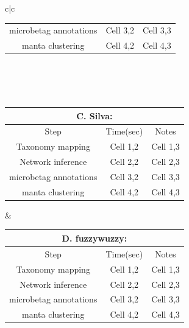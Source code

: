 \documentclass[sn-mathphys,Numbered, lineno]{sn-jnl}  %
\theoremstyle{thmstyleone}%
\theoremstyle{thmstyletwo}%
\theoremstyle{thmstylethree}%
\begin{document}
\begin{table}[ht]
\begin{adjustbox}{width=1.3\textwidth,center=\textwidth}
\begin{tabular}{c|c}
\begin{tabular}{ccc}
                    microbetag annotations & Cell 3,2 & Cell 3,3 \\

                    manta clustering & Cell 4,2 & Cell 4,3 \\

                \end{tabular} \\
                \\
                \hline
                \\
                \begin{tabular}{ccc}

                    \multicolumn{3}{c}{C. Silva: } \\
                    \toprule
                    Step &  Time(sec) & Notes \\
                    \toprule

                    Taxonomy mapping & Cell 1,2 & Cell 1,3 \\

                    Network inference & Cell 2,2 & Cell 2,3 \\

                    microbetag annotations & Cell 3,2 & Cell 3,3 \\

                    manta clustering & Cell 4,2 & Cell 4,3 \\

                \end{tabular} &

                \begin{tabular}{ccc}

                    \multicolumn{3}{c}{D. fuzzywuzzy: } \\
                    \toprule
                    Step &  Time(sec) & Notes \\
                    \toprule

                    Taxonomy mapping & Cell 1,2 & Cell 1,3 \\

                    Network inference & Cell 2,2 & Cell 2,3 \\

                    microbetag annotations & Cell 3,2 & Cell 3,3 \\

                    manta clustering & Cell 4,2 & Cell 4,3 \\


\end{tabular}
\end{tabular}
\end{adjustbox}
\end{table}
\end{document}
